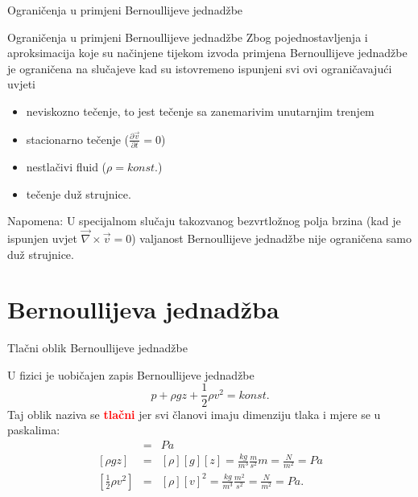 \documentclass[croatian]{beamer}
\begin{document}
\begin{frame}{Ograničenja u primjeni Bernoullijeve jednadžbe}

\begin{alertblock}{Ograničenja u primjeni Bernoullijeve jednadžbe}
Zbog pojednostavljenja i aproksimacija koje su načinjene tijekom
izvoda primjena Bernoullijeve jednadžbe je ograničena na slučajeve
kad su istovremeno ispunjeni svi ovi ograničavajući uvjeti 

\begin{itemize}
\item neviskozno tečenje, to jest tečenje sa zanemarivim unutarnjim trenjem 
\item stacionarno tečenje ($\frac{\partial\vec{v}}{\partial t}=0$) 
\item nestlačivi fluid ($\rho=konst.$) 
\item tečenje duž strujnice. 
\end{itemize}

\end{alertblock}
Napomena: U specijalnom slučaju takozvanog bezvrtložnog polja brzina
(kad je ispunjen uvjet $\vec{\nabla}\times\vec{v}=0$) valjanost Bernoullijeve
jednadžbe nije ograničena samo duž strujnice.
\end{frame}

\section{Bernoullijeva jednadžba}

\begin{frame}{Tlačni oblik Bernoullijeve jednadžbe}

U fizici je uobičajen zapis Bernoullijeve jednadžbe
\[
p+\rho gz+\frac{1}{2}\rho v^{2}=konst.
\]
Taj oblik naziva se \textbf{\textcolor{red}{tlačni}} jer svi članovi
imaju dimenziju tlaka i mjere se u paskalima:
\begin{eqnarray*}
[p] & = & Pa\\
{}[\rho gz] & = & [\rho][g][z]=\frac{kg}{m^{3}}\frac{m}{s^{2}}m=\frac{N}{m^{2}}=Pa\\
{}[\frac{1}{2}\rho v^{2}] & = & [\rho][v]^{2}=\frac{kg}{m^{3}}\frac{m^{2}}{s^{2}}=\frac{N}{m^{2}}=Pa.
\end{eqnarray*}
\end{frame}
\end{document}
